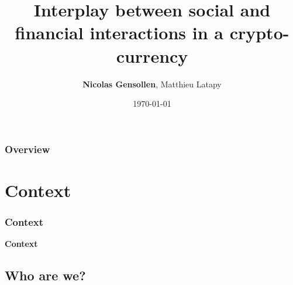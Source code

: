 \documentclass{beamer}
\title[social and financial interactions]{Interplay between social and financial interactions in a crypto-currency } %
\author{\textbf{Nicolas Gensollen}, Matthieu Latapy} %
\institute[LIP6] %
{
Laboratoire d'informatique de Paris 6 \\ %
\medskip
\textit{nicolas.gensollen@lip6.fr} %
}
\date{\today} %
\begin{document}
\begin{frame}
\titlepage %
\end{frame}

\begin{frame}
\frametitle{Overview} %
\tableofcontents %
\end{frame}


\section{Context} 

\begin{frame}
\frametitle{Context}

\begin{center}
{\huge \textbf{Context}}
\end{center}

\end{frame}

\subsection{Who are we?}
\end{document}
